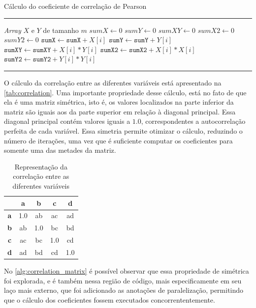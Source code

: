 \begin{algorithm}[htb]
	\caption{Cálculo do coeficiente de correlação de Pearson}
	\label{alg:correlation}
	\hrule
	\begin{algorithmic}[1]
		\REQUIRE \textit{Array} $X$ e $Y$ de tamanho $m$
		\STATE $sumX \gets 0$
		\STATE $sumY \gets 0$
		\STATE $sumXY \gets 0$
		\STATE $sumX2 \gets 0$
		\STATE $sumY2 \gets 0$
		\STATE $\texttt{sumX} \gets \texttt{sumX} + X[i]$
		\STATE $\texttt{sumY} \gets \texttt{sumY} + Y[i]$
		\STATE $\texttt{sumXY} \gets \texttt{sumXY} + X[i] * Y[i]$
		\STATE $\texttt{sumX2} \gets \texttt{sumX2} + X[i] * X[i]$
		\STATE $\texttt{sumY2} \gets \texttt{sumY2} + Y[i] * Y[i]$
		\ENDFOR
	\end{algorithmic}
	\hrule
	\fonte{}
\end{algorithm}

O cálculo da correlação entre as diferentes variáveis está apresentado na \autoref{tab:correlation}. Uma importante propriedade desse cálculo, está no fato de que ela é uma matriz simétrica, isto é, os valores localizados na parte inferior da matriz são iguais aos da parte superior em relação à diagonal principal. Essa diagonal principal contém valores iguais a $1.0$, correspondentes a autocorrelação perfeita de cada variável. Essa simetria permite otimizar o cálculo, reduzindo o número de iterações, uma vez que é suficiente computar os coeficientes para somente uma das metades da matriz.

\begin{table}[htb]
	\caption{Representação da correlação entre as diferentes variáveis}
	\centering
	\begin{tabular}{|c|c|c|c|c|}
		\hline
		           & \textbf{a} & \textbf{b} & \textbf{c} & \textbf{d} \\
		\hline
		\textbf{a} & 1.0        & ab         & ac         & ad         \\
		\hline
		\textbf{b} & ab         & 1.0        & bc         & bd         \\
		\hline
		\textbf{c} & ac         & bc         & 1.0        & cd         \\
		\hline
		\textbf{d} & ad         & bd         & cd         & 1.0        \\
		\hline
	\end{tabular}
	\fonte{}
	\label{tab:correlation}
\end{table}

No \autoref{alg:correlation_matrix} é possível observar que essa propriedade de simétrica foi explorada, e é também nessa região de código, mais especificamente em seu laço mais externo, que foi adicionado as anotações de paralelização, permitindo que o cálculo dos coeficientes fossem executados concorrententemente.

